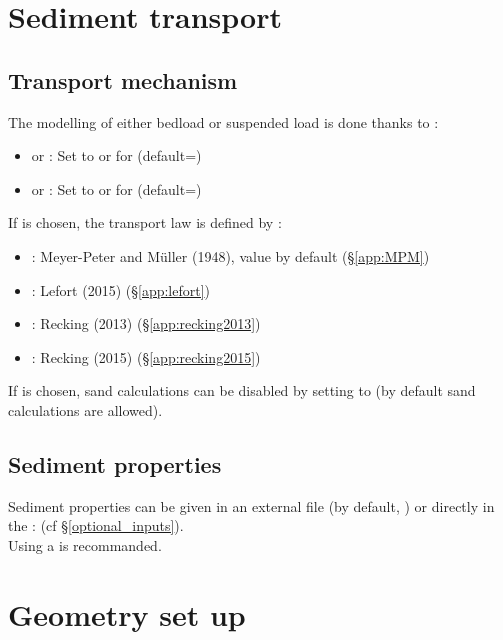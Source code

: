 \section{Sediment transport}
\subsection{Transport mechanism}
The modelling of either bedload or suspended load is done thanks to :
\begin{itemize}
	\item {} or  : Set to  or  for \Cbedload (default=)
	\item {} or  : Set to  or  for \Csuspension (default=)
\end{itemize}

If \Cbedload is chosen, the transport law is defined by  :
\begin{itemize}
	\item {} : Meyer-Peter and Müller (1948), value by default (\S \ref{app:MPM})
	\item {} : Lefort (2015) (\S \ref{app:lefort})
	\item {} : Recking (2013) (\S \ref{app:recking2013})
	\item {} : Recking (2015) (\S \ref{app:recking2015})
\end{itemize}

If \Csuspension is chosen, sand calculations can be disabled by setting  to  (by default sand calculations are allowed).

\subsection{Sediment properties}
Sediment properties can be given in an external file (by default, ) or directly in the \cas :  (cf \S \ref{optional_inputs}). \\

Using a \cas is recommanded.

\section{Geometry set up}
\label{geo_set_up}

